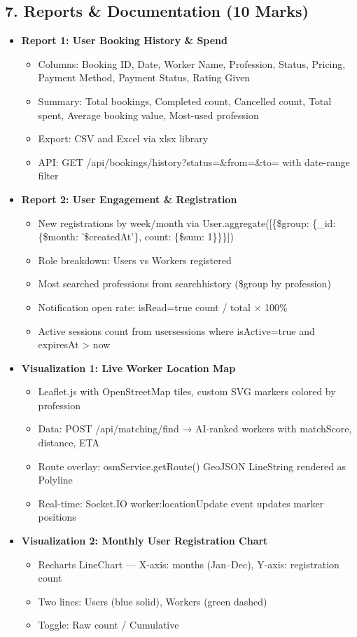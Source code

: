 \documentclass[12pt,a4paper]{article}
\begin{document}
\subsection*{7. Reports \& Documentation (10 Marks)}
\begin{itemize}[leftmargin=*]
    \item \textbf{Report 1: User Booking History \& Spend}
    \begin{itemize}
        \item Columns: Booking ID, Date, Worker Name, Profession, Status, Pricing, Payment Method, Payment Status, Rating Given
        \item Summary: Total bookings, Completed count, Cancelled count, Total spent, Average booking value, Most-used profession
        \item Export: CSV and Excel via xlsx library
        \item API: GET /api/bookings/history?status=\&from=\&to= with date-range filter
    \end{itemize}
    \item \textbf{Report 2: User Engagement \& Registration}
    \begin{itemize}
        \item New registrations by week/month via User.aggregate([\{\$group: \{\_id: \{\$month: '\$createdAt'\}, count: \{\$sum: 1\}\}\}])
        \item Role breakdown: Users vs Workers registered
        \item Most searched professions from searchhistory (\$group by profession)
        \item Notification open rate: isRead=true count / total × 100\%
        \item Active sessions count from usersessions where isActive=true and expiresAt > now
    \end{itemize}
    \item \textbf{Visualization 1: Live Worker Location Map}
    \begin{itemize}
        \item Leaflet.js with OpenStreetMap tiles, custom SVG markers colored by profession
        \item Data: POST /api/matching/find → AI-ranked workers with matchScore, distance, ETA
        \item Route overlay: osmService.getRoute() GeoJSON LineString rendered as Polyline
        \item Real-time: Socket.IO worker:locationUpdate event updates marker positions
    \end{itemize}
    \item \textbf{Visualization 2: Monthly User Registration Chart}
    \begin{itemize}
        \item Recharts LineChart — X-axis: months (Jan–Dec), Y-axis: registration count
        \item Two lines: Users (blue solid), Workers (green dashed)
        \item Toggle: Raw count / Cumulative
    \end{itemize}
\end{itemize}
\end{document}
